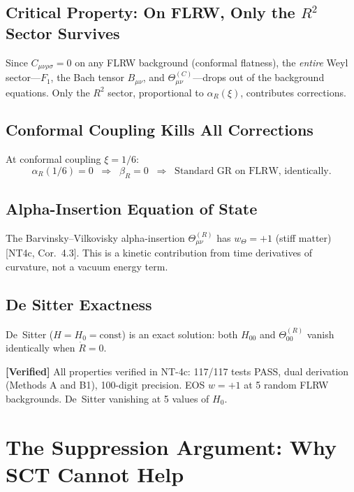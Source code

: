 \documentclass[11pt,a4paper]{article}
\theoremstyle{plain}
\theoremstyle{definition}
\theoremstyle{remark}
\newcommand{\fromlit}[1]{\textcolor{blue!70!black}{\textsf{[#1]}}}
\newcommand{\verified}[1]{%
  \par\smallskip\noindent
  \colorbox{green!10}{\parbox{\dimexpr\linewidth-2\fboxsep}{%
    \textcolor{green!50!black}{\textbf{[Verified]}} #1}}%
  \par\smallskip}
\begin{document}
\subsection{Critical Property: On FLRW, Only the $R^2$ Sector Survives}

Since $C_{\mu\nu\rho\sigma} = 0$ on any FLRW background (conformal
flatness), the \emph{entire} Weyl sector---$F_1$, the Bach tensor
$B_{\mu\nu}$, and $\Theta^{(C)}_{\mu\nu}$---drops out of the
background equations. Only the $R^2$ sector, proportional to
$\alpha_R(\xi)$, contributes corrections.

\subsection{Conformal Coupling Kills All Corrections}

At conformal coupling $\xi = 1/6$:
\begin{equation}
  \alpha_R(1/6) = 0 \;\;\Longrightarrow\;\; \beta_R = 0
  \;\;\Longrightarrow\;\;
  \text{Standard GR on FLRW, identically.}
\end{equation}

\subsection{Alpha-Insertion Equation of State}

The Barvinsky--Vilkovisky alpha-insertion $\Theta^{(R)}_{\mu\nu}$ has
$w_\Theta = +1$ (stiff matter) \fromlit{NT4c, Cor.~4.3}. This is a
kinetic contribution from time derivatives of curvature, not a vacuum
energy term.

\subsection{De Sitter Exactness}

De~Sitter ($H = H_0 = \text{const}$) is an exact solution: both
$H_{00}$ and $\Theta^{(R)}_{00}$ vanish identically when $\dot{R} = 0$.

\verified{All properties verified in NT-4c: 117/117 tests PASS, dual
derivation (Methods A and B1), 100-digit precision. EOS $w = +1$ at 5
random FLRW backgrounds. De~Sitter vanishing at 5 values of $H_0$.}

\section{The Suppression Argument: Why SCT Cannot Help}
\label{sec:suppression}
\end{document}
